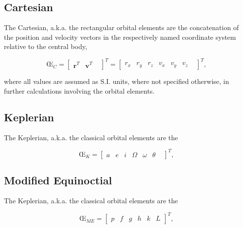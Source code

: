 \subsection{Cartesian}
The Cartesian, a.k.a. the rectangular orbital elements are the concatenation of
the position and velocity vectors in the respectively named coordinate system
relative to the central body,

\begin{equation}
    \textrm{\OE}_C=
    \begin{bmatrix}
        \mathbf{r}^T &
        \mathbf{v}^T &
    \end{bmatrix}^T
    =
    \begin{bmatrix}
        r_x &
        r_y &
        r_z &
        v_x &
        v_y &
        v_z &
    \end{bmatrix}^T,
\end{equation}

where all values are assumed as S.I. units, where not specified otherwise, in
further calculations involving the orbital elements.

\subsection{Keplerian}
The Keplerian, a.k.a. the classical orbital elements are the

\begin{equation}
    \textrm{\OE}_K=
    \begin{bmatrix}
        a &
        e &
        i &
        \Omega &
        \omega &
        \theta &
    \end{bmatrix}^T,
\end{equation}

\subsection{Modified Equinoctial}
The Keplerian, a.k.a. the classical orbital elements are the

\begin{equation}
    \textrm{\OE}_{ME}=
    \begin{bmatrix}
        p &
        f &
        g &
        h &
        k &
        L
    \end{bmatrix}^T,
\end{equation}


